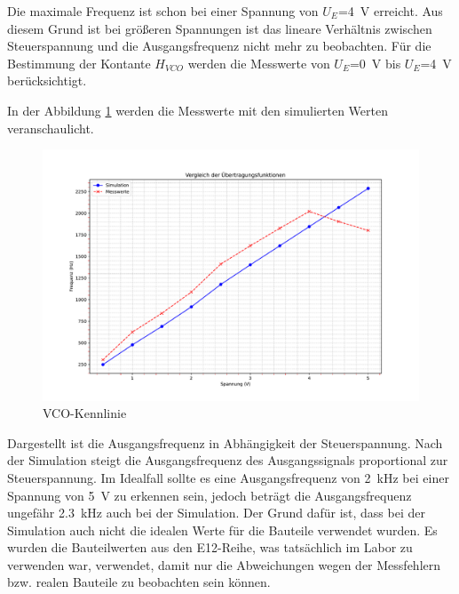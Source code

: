 Die maximale Frequenz ist schon bei einer Spannung von $U_{E}$=\SI{4}{\volt} erreicht. Aus diesem Grund ist bei größeren Spannungen ist das lineare Verhältnis zwischen Steuerspannung und die Ausgangsfrequenz nicht mehr zu beobachten. Für die Bestimmung der Kontante $H_{VCO}$ werden die Messwerte von $U_{E}$=\SI{0}{\volt} bis $U_{E}$=\SI{4}{\volt} berücksichtigt.


In der Abbildung \ref{fig:VCO_Kennlinie_Vergleich} werden die Messwerte mit den simulierten Werten veranschaulicht.

\begin{figure}[H]
  \centering
  \includegraphics[width=1\linewidth]{Elektronik-Laborprotokoll_PLL/Abbildungen/frequenz_vergleich.pdf}
  \caption{VCO-Kennlinie}
  \label{fig:VCO_Kennlinie_Vergleich}
\end{figure}

Dargestellt ist die Ausgangsfrequenz in Abhängigkeit der Steuerspannung. Nach der Simulation steigt die Ausgangsfrequenz des Ausgangssignals proportional zur Steuerspannung. Im Idealfall sollte es eine Ausgangsfrequenz von \SI{2}{\kilo\hertz} bei einer Spannung von \SI{5}{\volt} zu erkennen sein, jedoch beträgt die Ausgangsfrequenz ungefähr \SI{2,3}{\kilo\hertz} auch bei der Simulation. Der Grund dafür ist, dass bei der Simulation auch nicht die idealen Werte für die Bauteile verwendet wurden. Es wurden die Bauteilwerten aus den E12-Reihe, was tatsächlich im Labor zu verwenden war, verwendet, damit nur die Abweichungen wegen der Messfehlern bzw. realen Bauteile zu beobachten sein können.

